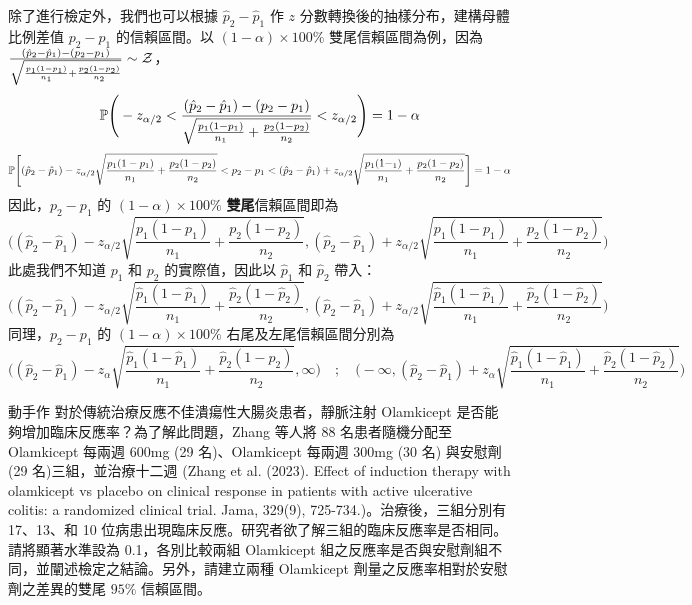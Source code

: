     除了進行檢定外，我們也可以根據 $\hat{p}_2 - \hat{p}_1$ 作 $z$ 分數轉換後的抽樣分布，建構母體比例差值 $p_2 - p_1$ 的信賴區間。以 $(1-\alpha) \times 100\%$ 雙尾信賴區間為例，因為 $\frac{(\hat{p}_2-\hat{p}_1)-(p_2-p_1)}{\sqrt{\frac{p_1(1-p_1)}{n_1} + \frac{p_2(1-p_2)}{n_2}}} \sim \mathcal{Z}$，
    \smallskip
    \[\mathbb{P}\Bigg(-z_{\alpha/2} < \frac{(\hat{p}_2-\hat{p}_1)-(p_2-p_1)}{\sqrt{\frac{p_1(1-p_1)}{n_1} + \frac{p_2(1-p_2)}{n_2}}} < z_{\alpha/2}\Bigg) = 1-\alpha\]
    \[\mathbb{P}\Bigg[(\hat{p}_2-\hat{p}_1) - z_{\alpha/2} \sqrt{\frac{p_1(1-p_1)}{n_1} + \frac{p_2(1-p_2)}{n_2}} < p_2-p_1  < (\hat{p}_2-\hat{p}_1) + z_{\alpha/2} \sqrt{\frac{p_1(1-_1)}{n_1} + \frac{p_2(1-p_2)}{n_2}}\Bigg] = 1-\alpha\]
    \smallskip
    因此，$p_2-p_1$ 的 $(1-\alpha) \times 100\%$ \textbf{雙尾}信賴區間即為
    \smallskip
    \[\Bigg((\hat{p}_2-\hat{p}_1) - z_{\alpha/2} \sqrt{\frac{p_1(1-p_1)}{n_1} + \frac{p_2(1-p_2)}{n_2}}, (\hat{p}_2-\hat{p}_1) + z_{\alpha/2} \sqrt{\frac{p_1(1-p_1)}{n_1} + \frac{p_2(1-p_2)}{n_2}}\Bigg)\]
    \smallskip
    此處我們不知道 $p_1$ 和 $p_2$ 的實際值，因此以 $\hat{p}_1$ 和 $\hat{p}_2$ 帶入：
    \smallskip
    \[\Bigg((\hat{p}_2-\hat{p}_1) - z_{\alpha/2} \sqrt{\frac{\hat{p}_1(1-\hat{p}_1)}{n_1} + \frac{\hat{p}_2(1-\hat{p}_2)}{n_2}}, (\hat{p}_2-\hat{p}_1) + z_{\alpha/2} \sqrt{\frac{\hat{p}_1(1-\hat{p}_1)}{n_1} + \frac{\hat{p}_2(1-\hat{p}_2)}{n_2}}\Bigg)\]
    \smallskip
    同理，$p_2-p_1$ 的 $(1-\alpha) \times 100\%$ 右尾及左尾信賴區間分別為
    \smallskip
    \[\Bigg((\hat{p}_2-\hat{p}_1) - z_{\alpha} \sqrt{\frac{\hat{p}_1(1-\hat{p}_1)}{n_1} + \frac{\hat{p}_2(1-\hat{p}_2)}{n_2}}, \infty \Bigg) \quad ; \quad \Bigg(-\infty, (\hat{p}_2-\hat{p}_1) + z_{\alpha} \sqrt{\frac{\hat{p}_1(1-\hat{p}_1)}{n_1} + \frac{\hat{p}_2(1-\hat{p}_2)}{n_2}} \Bigg)\]
    \smallskip

    \begin{custom}{動手作}
        對於傳統治療反應不佳潰瘍性大腸炎患者，靜脈注射 Olamkicept 是否能夠增加臨床反應率？為了解此問題，Zhang 等人將 88 名患者隨機分配至 Olamkicept 每兩週 600mg (29 名)、Olamkicept 每兩週 300mg (30 名) 與安慰劑 (29 名)三組，並治療十二週 (Zhang et al. (2023). Effect of induction therapy with olamkicept vs placebo on clinical response in patients with active ulcerative colitis: a randomized clinical trial. Jama, 329(9), 725-734.)。治療後，三組分別有 17、13、和 10 位病患出現臨床反應。研究者欲了解三組的臨床反應率是否相同。請將顯著水準設為 0.1，各別比較兩組 Olamkicept 組之反應率是否與安慰劑組不同，並闡述檢定之結論。另外，請建立兩種 Olamkicept 劑量之反應率相對於安慰劑之差異的雙尾 $95\%$ 信賴區間。
    \end{custom}

